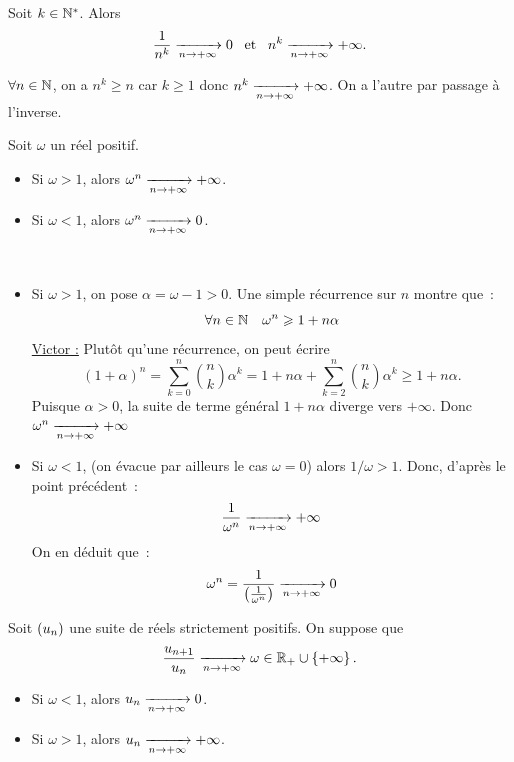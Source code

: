\documentclass{magnolia}
\begin{document}
\begin{proposition}[utile=-3]
Soit $k\in{\mathbb{N}^*}$. Alors
\[\frac{1}{n^k} \xrightarrow[n\rightarrow +\infty]{} 0 \quad\!\text{et}\quad\!
  n^k \xrightarrow[n\rightarrow +\infty]{} +\infty.\]
\end{proposition}

\begin{preuve}
$\forall n\in \mathbb{N}$, on a $n^k\geq n$ car $k\geq 1$ donc $n^k\xrightarrow[n\rightarrow +\infty]{}+\infty$. On a l'autre par passage à l'inverse.
\end{preuve}

\begin{proposition}[utile=-3]
Soit $\omega$ un réel positif.
\begin{itemize}
\item Si $\omega>1$, alors $\omega^n\xrightarrow[n\rightarrow +\infty]{} +\infty$.
\item Si $\omega<1$, alors $\omega^n\xrightarrow[n\rightarrow +\infty]{} 0$.
\end{itemize}
\end{proposition}

\begin{preuve}
$\quad$
\begin{itemize}
\item Si $\omega>1$, on pose $\alpha=\omega-1>0$. Une simple récurrence
  sur $n$ montre que~:
  \[\forall n\in\mathbb{N} \quad  \omega^n \geqslant 1+n\alpha\]
  \underline{Victor :} Plutôt qu'une récurrence, on peut écrire $$(1+\alpha)^n=\sum_{k=0}^n\binom{n}{k}\alpha^k=1+n\alpha+\sum_{k=2}^n\binom{n}{k}\alpha^k \geq 1+n\alpha.$$
  Puisque $\alpha>0$, la suite de terme général $1+n\alpha$ diverge
  vers $+\infty$. Donc $\omega^n \xrightarrow[n\rightarrow +\infty]{} +\infty$
\item Si $\omega<1$, (on évacue par ailleurs le cas $\omega=0$) alors $1/\omega>1$. Donc, d'après le point précédent~:
  \[\frac{1}{\omega^n} \xrightarrow[n\rightarrow +\infty]{} +\infty\]
  On en déduit que~:
  \[\omega^n=\frac{1}{\left(\frac{1}{\omega^n}\right)} \xrightarrow[n\rightarrow +\infty]{} 0\]
\end{itemize}
\end{preuve}


\begin{proposition}[utile=-3]
Soit $\left(u_n\right)$ une suite de réels strictement positifs. On suppose que
\[\frac{u_{n+1}}{u_n}\xrightarrow[n\rightarrow +\infty]{}\omega\in\mathbb{R}_+\cup\left\{+\infty\right\}.\]
\begin{itemize}
\item Si $\omega<1$, alors $u_n\xrightarrow[n\rightarrow +\infty]{} 0$.
\item Si $\omega>1$, alors $u_n\xrightarrow[n\rightarrow +\infty]{} +\infty$.
\end{itemize}
\end{proposition}
\end{document}
